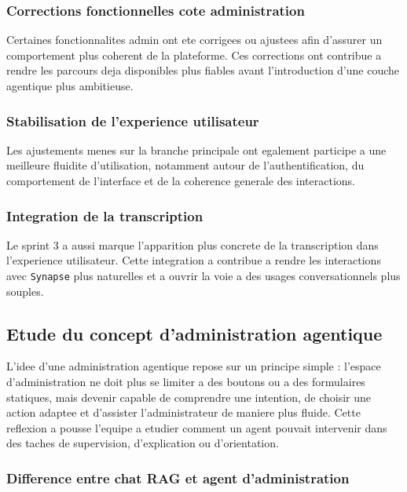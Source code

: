 \subsubsection{Corrections fonctionnelles cote administration}

Certaines fonctionnalites admin ont ete corrigees ou ajustees afin d'assurer un comportement plus coherent de la plateforme. Ces corrections ont contribue a rendre les parcours deja disponibles plus fiables avant l'introduction d'une couche agentique plus ambitieuse.

\subsubsection{Stabilisation de l'experience utilisateur}

Les ajustements menes sur la branche principale ont egalement participe a une meilleure fluidite d'utilisation, notamment autour de l'authentification, du comportement de l'interface et de la coherence generale des interactions.

\subsubsection{Integration de la transcription}

Le sprint 3 a aussi marque l'apparition plus concrete de la transcription dans l'experience utilisateur. Cette integration a contribue a rendre les interactions avec \texttt{Synapse} plus naturelles et a ouvrir la voie a des usages conversationnels plus souples.

\subsection{Etude du concept d'administration agentique}

L'idee d'une administration agentique repose sur un principe simple : l'espace d'administration ne doit plus se limiter a des boutons ou a des formulaires statiques, mais devenir capable de comprendre une intention, de choisir une action adaptee et d'assister l'administrateur de maniere plus fluide. Cette reflexion a pousse l'equipe a etudier comment un agent pouvait intervenir dans des taches de supervision, d'explication ou d'orientation.

\subsubsection{Difference entre chat RAG et agent d'administration}

